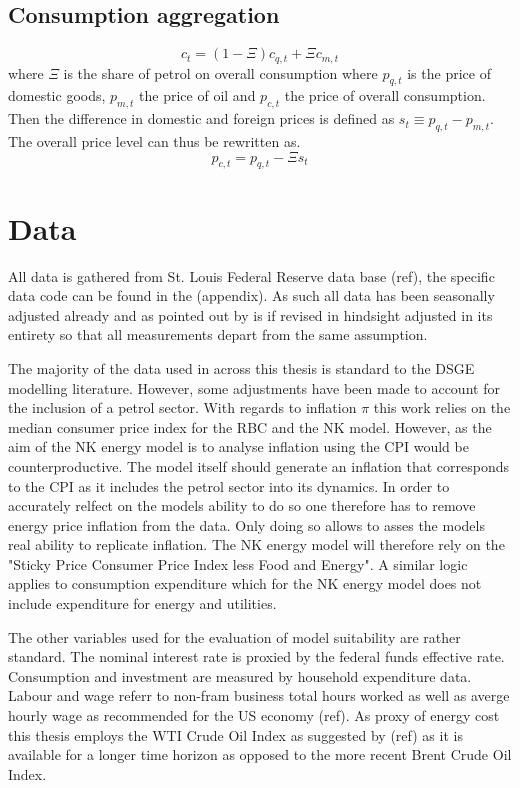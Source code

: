 \documentclass[12pt,a4paper,english]{article} %
\let\oldsection\section
\renewcommand\section{\clearpage\oldsection}
\begin{document}
	\subsection{Consumption aggregation}
	\begin{equation}
		c_t = (1 - \Xi) c_{q,t} + \Xi c_{m, t}
	\end{equation}
	where $\Xi$ is the share of petrol on overall consumption
	where $p_{q,t}$ is the price of domestic goods, $p_{m,t}$ the price of oil and $p_{c,t}$ the price of overall consumption. Then the difference in domestic and foreign prices is defined as $s_t \equiv p_{q,t} - p_{m,t}$. The overall price level can thus be rewritten as. 
	\begin{equation}
		p_{c,t} = p_{q,t} - \Xi s_t
	\end{equation}
	
	
	
	\section{Data}
	
	All data is gathered from St. Louis Federal Reserve data base (ref), the specific data code can be found in the (appendix). As such all data has been seasonally adjusted already and as pointed out by \cite{pfeifer_guide_2021} is if revised in hindsight adjusted in its entirety so that all measurements depart from the same assumption.
	
	The majority of the data used in across this thesis is standard to the DSGE modelling literature. However, some adjustments have been made to account for the inclusion of a petrol sector.
	With regards to inflation $\pi$ this work relies on the median consumer price index for the RBC and the NK model. However, as the aim of the NK energy model is to analyse inflation using the CPI would be counterproductive. The model itself should generate an inflation that corresponds to the CPI as it includes the petrol sector into its dynamics. In order to accurately relfect on the models ability to do so one therefore has to remove energy price inflation from the data. Only doing so allows to asses the models real ability to replicate inflation. The NK energy model will therefore rely on the "Sticky Price Consumer Price Index less Food and Energy". A similar logic applies to consumption expenditure which for the NK energy model does not include expenditure for energy and utilities.
	
	The other variables used for the evaluation of model suitability are rather standard. The nominal interest rate is proxied by the federal funds effective rate. Consumption and investment are measured by household expenditure data. Labour and wage referr to non-fram business total hours worked as well as averge hourly wage as recommended for the US economy (ref). As proxy of energy cost this thesis employs the WTI Crude Oil Index as suggested by (ref) as it is available for a longer time horizon as opposed to the more recent Brent Crude Oil Index.
	
\end{document}
